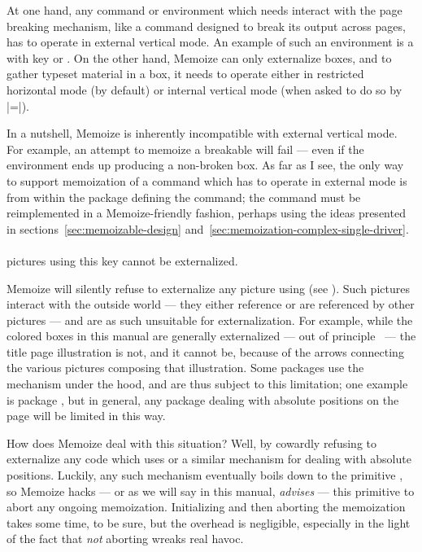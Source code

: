 \documentclass[a4paper,11pt]{article}
\begin{document}
At one hand, any command or environment which needs interact with the page
breaking mechanism, like a command designed to break its output across pages,
has to operate in external vertical mode.  An example of such an environment is
a  with key  or .  On
the other hand, Memoize can only externalize boxes, and to gather typeset
material in a box, it needs to operate either in restricted horizontal mode (by
default) or internal vertical mode (when asked to do so by
|=|).

In a nutshell, Memoize is inherently incompatible with external vertical mode.
For example, an attempt to memoize a breakable  will fail ---
even if the environment ends up producing a non-broken box.  As far as I see,
the only way to support memoization of a command which has to operate in
external mode is from within the package defining the command; the command must
be reimplemented in a Memoize-friendly fashion, perhaps using the ideas
presented in sections~\ref{sec:memoizable-design}
and~\ref{sec:memoization-complex-single-driver}.



\paragraph{}
\TikZ pictures using this key cannot be externalized.

Memoize will silently refuse to externalize any \TikZ picture using
 (see ).  Such pictures
interact with the outside world --- they either reference or are referenced by
other pictures --- and are as such unsuitable for externalization.  For
example, while the colored boxes in this manual are generally externalized ---
out of principle \Smiley\ --- the title page illustration is not, and it cannot
be, because of the arrows connecting the various \TikZ pictures composing that
illustration.  Some packages use the  mechanism
under the hood, and are thus subject to this limitation; one example is package
, but in general, any package dealing with absolute positions on the
page will be limited in this way.

How does Memoize deal with this situation?  Well, by cowardly refusing to
externalize any code which uses  or a similar
mechanism for dealing with absolute positions.  Luckily, any such mechanism
eventually boils down to the  primitive , so
Memoize hacks --- or as we will say in this manual, \emph{advises} --- this
primitive to abort any ongoing memoization.  Initializing and then aborting the
memoization takes some time, to be sure, but the overhead is negligible,
especially in the light of the fact that \emph{not} aborting wreaks real havoc.
\end{document}
